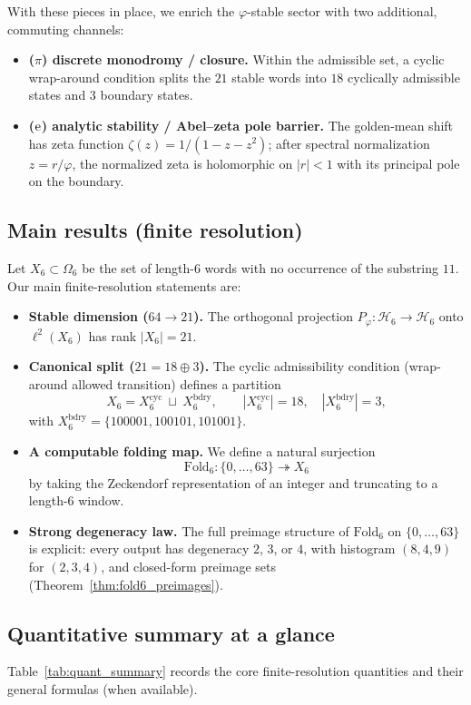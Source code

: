 With these pieces in place, we enrich the $\varphi$-stable sector with two additional, commuting channels:
\begin{itemize}
\item \textbf{($\pi$) discrete monodromy / closure.}
Within the admissible set, a cyclic wrap-around condition splits the $21$ stable words into $18$ cyclically admissible states and $3$ boundary states.
\item \textbf{($\mathrm{e}$) analytic stability / Abel--zeta pole barrier.}
The golden-mean shift has zeta function $\zeta(z)=1/(1-z-z^2)$; after spectral normalization $z=r/\varphi$, the normalized zeta is holomorphic on $|r|<1$ with its principal pole on the boundary.
\end{itemize}

\subsection{Main results (finite resolution)}
Let $X_6\subset \Omega_6$ be the set of length-$6$ words with no occurrence of the substring $11$.
Our main finite-resolution statements are:
\begin{itemize}
\item \textbf{Stable dimension ($64\to 21$).} The orthogonal projection $P_\varphi:\mathcal{H}_6\to\mathcal{H}_6$ onto $\ell^2(X_6)$ has rank $|X_6|=21$.
\item \textbf{Canonical split ($21=18\oplus 3$).} The cyclic admissibility condition (wrap-around allowed transition) defines a partition
\[
X_6=X_6^{\mathrm{cyc}}\ \sqcup\ X_6^{\mathrm{bdry}},
\qquad |X_6^{\mathrm{cyc}}|=18,\quad |X_6^{\mathrm{bdry}}|=3,
\]
with $X_6^{\mathrm{bdry}}=\{100001,100101,101001\}$.
\item \textbf{A computable folding map.} We define a natural surjection
\[
\mathrm{Fold}_6:\{0,\dots,63\}\twoheadrightarrow X_6
\]
by taking the Zeckendorf representation of an integer and truncating to a length-$6$ window.
\item \textbf{Strong degeneracy law.} The full preimage structure of $\mathrm{Fold}_6$ on $\{0,\dots,63\}$ is explicit: every output has degeneracy $2$, $3$, or $4$, with histogram $(8,4,9)$ for $(2,3,4)$, and closed-form preimage sets (Theorem~\ref{thm:fold6_preimages}).
\end{itemize}

\subsection{Quantitative summary at a glance}
\label{subsec:intro_quant_summary}
Table~\ref{tab:quant_summary} records the core finite-resolution quantities and their general formulas (when available).

